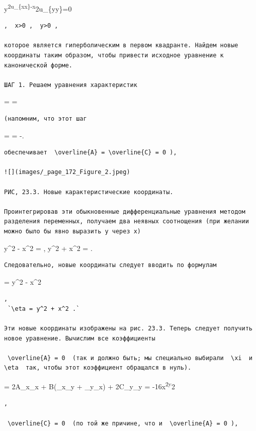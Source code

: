 \documentclass[
  ukrainian,
]{article}
\begin{document}
y\textsuperscript{2u\_\{xx\}-x}2u\_\{yy\}=0

\begin{verbatim}
,  x>0 ,  y>0 ,

которое является гиперболическим в первом квадранте. Найдем новые координаты таким образом, чтобы привести исходное уравнение к канонической форме.

ШАГ 1. Решаем уравнения характеристик
\end{verbatim}

 =  = 

\begin{verbatim}
(напомним, что этот шаг
\end{verbatim}

 =  = -.

\begin{verbatim}
обеспечивает  \overline{A} = \overline{C} = 0 ),

![](images/_page_172_Figure_2.jpeg)

РИС, 23.3. Новые карактеристические координаты.

Проинтегрировав эти обыкновенные дифференциальные уравнения методом разделения переменных, получаем два неявных соотнощения (при желании можно было бы явно выразить у через х)
\end{verbatim}

y\^{}2 - x\^{}2 = , y\^{}2 + x\^{}2 = .

\begin{verbatim}
Следовательно, новые координаты следует вводить по формулам
\end{verbatim}

\xi = y\^{}2 - x\^{}2

\begin{verbatim}
,  
 `\eta = y^2 + x^2 .`

Эти новые координаты изображены на рис. 23.3. Теперь следует получить новое уравнение. Вычислим все коэффициенты

 \overline{A} = 0  (так и должно быть; мы специально выбирали  \xi  и  \eta  так, чтобы этот коэффициент обращался в нуль).
\end{verbatim}

 = 2A\xi\_x\eta\_x + B(\xi\_x\eta\_y + \xi\_y\eta\_x) +
2C\xi\_y\eta\_y = -16x\textsuperscript{2y}2

\begin{verbatim}
,

 \overline{C} = 0  (по той же причине, что и  \overline{A} = 0 ),
\end{verbatim}
\end{document}
